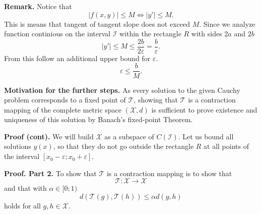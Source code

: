 \documentclass[10pt]{beamer}
\begin{document}
\begin{frame}
  \textbf{Remark.} Notice that
  \[|f(x, y)| \le M \Leftrightarrow |y'| \le M.\]
  This is means that tangent of tangent slope does not exceed \(M\). Since we analyze function
  continious on the interval \(\mathcal{I}\) within the rectangle \(R\) with sides \(2a\) and \(2b\)
  \[|y'| \le M \le \frac{2b}{2\varepsilon} = \frac{b}{\varepsilon}.\]
  From this follow an additional upper bound for \(\varepsilon\).
  \[\varepsilon \le \frac{b}{M}.\]
\end{frame}

\begin{frame}
  \textbf{Motivation for the further steps.} As every solution to the given Cauchy problem
  corresponds to a fixed point of \(\mathcal{T}\),
  showing that \(\mathcal{T}\) is a contraction mapping of the complete
  metric space \((\mathcal{X}, d)\) is sufficient to prove existence and uniqueness
  of this solution by Banach’s fixed-point Theorem.
  \vspace{0.3cm}

\end{frame}

\begin{frame}
  \textbf{Proof (cont).} We will build \(\mathcal{X}\) as a subspace of \(C(\mathcal{I})\).
  Let us bound all solutions \(y(x)\), so that they do not go outside the rectangle \(R\) at all points of the
  interval \([x_0 - \varepsilon; x_0 + \varepsilon]\).

\end{frame}

\begin{frame}
  \textbf{Proof. Part 2.} To show that \(\mathcal{T}\) is a contraction mapping is to show that
  \[\mathcal{T}: \mathcal{X} \rightarrow \mathcal{X}\] and that with \(\alpha \in [0;1)\)
  \[d(\mathcal{T}(g), \mathcal{T}(h)) \le \alpha d(g, h)\]
  holds for all \(g, h \in \mathcal{X}\).
\end{frame}
\end{document}
